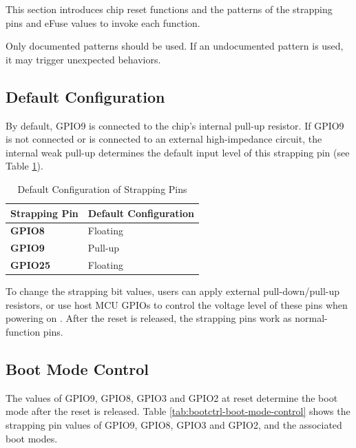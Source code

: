 \documentclass[main\_\_EN.tex]{subfiles}
\begin{document}
This section introduces chip reset functions and the patterns of the strapping pins and eFuse values to invoke each function.

\begin{importantlisting}

Only documented patterns should be used. If an undocumented pattern is used, it may trigger unexpected behaviors.
\end{importantlisting}

\subsection{Default Configuration}
By default, GPIO9 is connected to the chip's internal pull-up resistor. If GPIO9 is not connected or is connected to an external high-impedance circuit, the internal weak pull-up determines the default input level of this strapping pin (see Table \ref{tab:bootctrl-default-config-strapping-pins}).

\clearpage
\begin{longtable}[c]{|p{2.5cm}|p{3.5cm}|}
\caption{Default Configuration of Strapping Pins}
\label{tab:bootctrl-default-config-strapping-pins} \\
    \hline
    \rowcolor{lightgray}
  \textbf{Strapping Pin} & \textbf{Default Configuration} \\ \hline
  \textbf{GPIO8} & Floating \\ \hline
  \textbf{GPIO9} & Pull-up \\ \hline
  \textbf{GPIO25} & Floating \\ \hline
\end{longtable}

To change the strapping bit values, users can apply external pull-down/pull-up resistors, or use host MCU GPIOs to control the voltage level of these pins when powering on \chipname{}. After the reset is released, the strapping pins work as normal-function pins.





\subsection{Boot Mode Control}\label{sec:bootModeControl}

The values of GPIO9, GPIO8, GPIO3 and GPIO2 at reset determine the boot mode after the reset is released. Table \ref{tab:bootctrl-boot-mode-control} shows the strapping pin values of GPIO9, GPIO8, GPIO3 and GPIO2, and the associated boot modes.
\end{document}
